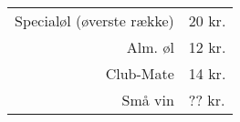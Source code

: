 \documentclass{article}
\begin{document}

\maketitle

\null

\Huge
\begin{tabular}{r|l}
Specialøl (øverste række) & 20 kr.\\
Alm. øl & 12 kr.\\
Club-Mate & 14 kr.\\
Små vin & ?? kr.
\end{tabular}

\dansk

\underskriv
\end{document}
